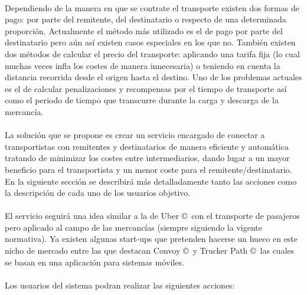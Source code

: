 \documentclass[10pt, a4paper,spanish]{article}
\begin{document}
			\paragraph{}
			Dependiendo de la manera en que se contrate el transporte existen dos formas de pago: por parte del remitente, del destinatario o respecto de una determinada proporción. Actualmente el método más utilizado es el de pago por parte del destinatario pero aún así existen casos especiales en los que no. También existen dos métodos de calcular el precio del transporte: aplicando una tarifa fija (lo cual muchas veces infla los costes de manera innecesaria) o teniendo en cuenta la distancia recorrida desde el origen hasta el destino. Uno de los problemas actuales es el de calcular penalizaciones y recompensas por el tiempo de transporte así como el periodo de tiempo que transcurre durante la carga y descarga de la mercancía.

			\paragraph{}
			La solución que se propone es crear un servicio encargado de conectar a transportistas con remitentes y destinatarios de manera eficiente y automática tratando de minimizar los costes entre intermediarios, dando lugar a un mayor beneficio para el transportista y un menor coste para el remitente/destinatario. En la siguiente sección se describirá más detalladamente tanto las acciones como la descripción de cada uno de los usuarios objetivo.

			\paragraph{}
			El servicio seguirá una idea similar a la de Uber \copyright\  con el transporte de pasajeros pero aplicado al campo de las mercancías (siempre siguiendo la vigente normativa). Ya existen algunas start-ups que pretenden hacerse un hueco en este nicho de mercado entre las que destacan Convoy \copyright\ y Trucker Path \copyright\ las cuales se basan en una aplicación para sistemas móviles. \cite{expansion_uber_transporte}

			\paragraph{}
			Los usuarios del sistema podran realizar las siguientes acciones:
\end{document}
